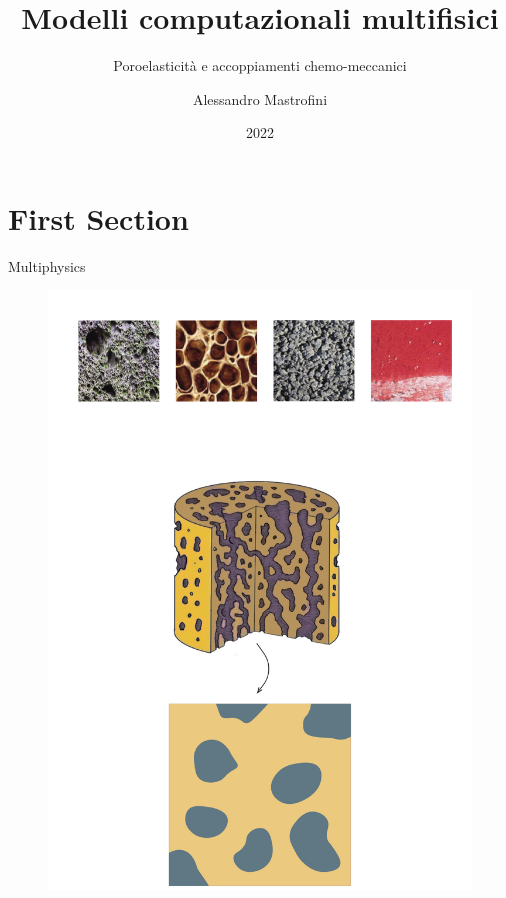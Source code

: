 \documentclass[aspectratio=169,xcolor=dvipsnames]{beamer}
\title[short title]{Modelli computazionali multifisici} %
\subtitle{Poroelasticità e accoppiamenti chemo-meccanici}
\author[Pin-Yen] {Alessandro Mastrofini}
\institute[NTU] %
{
Meccanica Computazionale dei Tessuti e Biomateriali \\
Università degli Studi di Roma Tor Vergata%
}
\date{2022} %
\begin{document}
\begin{frame}
    \titlepage
\end{frame}

\section{First Section}

\begin{frame}{Multiphysics}
\begin{figure}
\begin{minipage}{0.35\linewidth}
\includegraphics[width=\linewidth]{poroelasticity.pdf}
\end{minipage}\hfill
\begin{minipage}{0.65\linewidth}\centering

\end{minipage}
\end{figure}
\end{frame}
\end{document}
